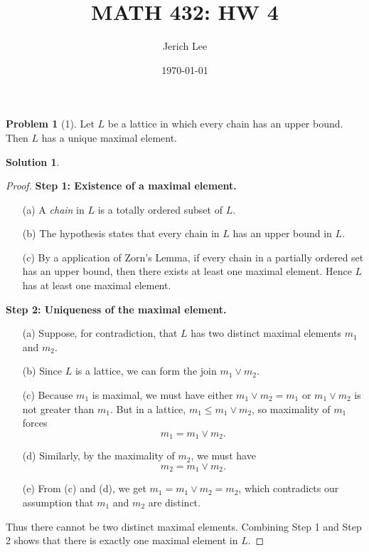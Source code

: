\documentclass[12pt]{article}
\title{MATH 432: HW 4}
\author{Jerich Lee}
\date{\today}
\theoremstyle{definition} %
\newtheorem{solution}{Solution}
\newtheorem{problem}{Problem}
\theoremstyle{plain} %
\begin{document}
\maketitle
\begin{problem}[1]
    Let $L$ be a lattice in which every chain has an upper bound. Then $L$ has a unique maximal element.
\end{problem}
\begin{solution}

        \begin{proof}
        \textbf{Step 1: Existence of a maximal element.}
        
        \begin{enumerate}
            \item[(a)] A \emph{chain} in $L$ is a totally ordered subset of $L$.
            \item[(b)] The hypothesis states that every chain in $L$ has an upper bound in $L$. 
            \item[(c)] By a application of Zorn's Lemma, if every chain in a partially ordered set has an upper bound, then there exists at least one maximal element. Hence $L$ has at least one maximal element.
        \end{enumerate}
        
        \noindent
        \textbf{Step 2: Uniqueness of the maximal element.}
        
        \begin{enumerate}
            \item[(a)] Suppose, for contradiction, that $L$ has two distinct maximal elements $m_1$ and $m_2$.
            \item[(b)] Since $L$ is a lattice, we can form the join $m_1 \vee m_2$. 
            \item[(c)] Because $m_1$ is maximal, we must have either $m_1 \vee m_2 = m_1$ or $m_1 \vee m_2$ is not greater than $m_1$. But in a lattice, $m_1 \leq m_1 \vee m_2$, so maximality of $m_1$ forces
            \[
                m_1 = m_1 \vee m_2.
            \]
            \item[(d)] Similarly, by the maximality of $m_2$, we must have
            \[
                m_2 = m_1 \vee m_2.
            \]
            \item[(e)] From (c) and (d), we get $m_1 = m_1 \vee m_2 = m_2$, which contradicts our assumption that $m_1$ and $m_2$ are distinct.
        \end{enumerate}
        
        \noindent
        Thus there cannot be two distinct maximal elements. Combining Step 1 and Step 2 shows that there is exactly one maximal element in $L$.
        
        \end{proof}
\end{solution}
\end{document}
